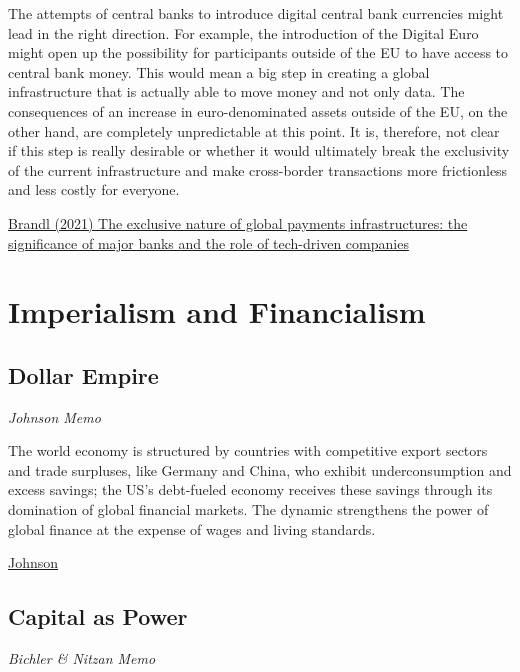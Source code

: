 \documentclass[
]{book}
\begin{document}
The attempts of central banks to introduce digital central bank currencies might lead in the right direction. For example, the introduction of the Digital Euro might open up the possibility for participants outside of the EU to have access to central bank money. This would mean a big step in creating a global infrastructure that is actually able to move money and not only data. The consequences of an increase in euro-denominated assets outside of the EU, on the other hand, are completely unpredictable at this point. It is, therefore, not clear if this step is really desirable or whether it would ultimately break the exclusivity of the current infrastructure and make cross-border transactions more frictionless and less costly for everyone.

\href{https://www.tandfonline.com/doi/full/10.1080/09692290.2021.2016470}{Brandl (2021) The exclusive nature of global payments infrastructures: the significance of major banks and the role of tech-driven companies}

\hypertarget{imperialism-and-financialism-1}{%
\chapter{Imperialism and Financialism}\label{imperialism-and-financialism-1}}

\hypertarget{dollar-empire}{%
\section{Dollar Empire}\label{dollar-empire}}

\emph{Johnson Memo}

The world economy is structured by countries with competitive export sectors and trade surpluses, like Germany and China, who exhibit underconsumption and excess savings; the US's debt-fueled economy receives these savings through its domination of global financial markets. The dynamic strengthens the power of global finance at the expense of wages and living standards.

\href{https://phenomenalworld.org/analysis/reconstruction-finance}{Johnson}

\hypertarget{capital-as-power}{%
\section{Capital as Power}\label{capital-as-power}}

\emph{Bichler \& Nitzan Memo}
\end{document}
